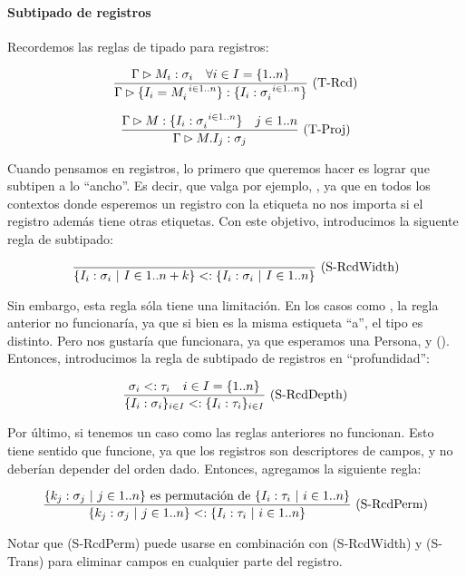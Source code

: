 \paragraph{Subtipado de registros}

Recordemos las reglas de tipado para registros:

\[\frac{\Gamma \rhd M_i : \sigma_i\quad \forall i \in I = \{1..n\}}{\Gamma \rhd \{I_i = M_i^{\ i \in 1..n}\}:\{I_i : \sigma_i^{\ i \in 1..n}\}}\ \text{(T-Rcd)}\]

\[\frac{\Gamma \rhd M : \{I_i : \sigma_{i}^{\ i \in 1..n}\}\quad j\in 1..n}{\Gamma \rhd M.I_j : \sigma_j}\ \text{(T-Proj)}\]

Cuando pensamos en registros, lo primero que queremos hacer es lograr que subtipen a lo ``ancho''. Es decir, que valga por ejemplo, , ya que en todos los contextos donde esperemos un registro con la etiqueta  no nos importa si el registro además tiene otras etiquetas. Con este objetivo, introducimos la siguente regla de subtipado:

\[\frac{}{\{I_i : \sigma_i \ |\  I \in 1..n + k\} <: \{I_i:\sigma_i \ |\  I \in 1..n\}}\ \text{(S-RcdWidth)}\]

Sin embargo, esta regla sóla tiene una limitación. En los casos como , la regla anterior no funcionaría, ya que si bien es la misma estiqueta ``a'', el tipo es distinto. Pero nos gustaría que funcionara, ya que esperamos una Persona, y  (). Entonces, introducimos la regla de subtipado de registros en ``profundidad'':

\[\frac{\sigma_i <: \tau_i\quad i\in I = \{1..n\}}{\{I_i : \sigma_i\}_{i\in I} <: \{I_i : \tau_i\}_{i\in I}}\ \text{(S-RcdDepth)}\]

Por último, si tenemos un caso como  las reglas anteriores no funcionan. Esto tiene sentido que funcione, ya que los registros son descriptores de campos, y no deberían depender del orden dado. Entonces, agregamos la siguiente regla:

\[\frac{\{k_j : \sigma_j \ |\  j\in 1..n\} \text{ es permutación de } \{I_i : \tau_i \ |\  i \in 1..n\}}{\{k_j : \sigma_j \ |\  j\in 1..n\} <: \{I_i : \tau_i \ |\  i \in 1..n\}}\ \text{(S-RcdPerm)}\]

Notar que (S-RcdPerm) puede usarse en combinación con (S-RcdWidth) y (S-Trans) para eliminar campos en cualquier parte del registro.

